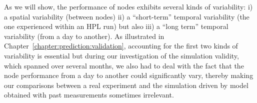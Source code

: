             As we will show, the performance of nodes exhibits several kinds of variability: i) a spatial variability
            (between nodes) ii) a ``short-term'' temporal variability (the one experienced within an HPL run) but also
            iii) a ``long term'' temporal variability (from a day to another). As illustrated in
            Chapter~\ref{chapter:prediction:validation}, accounting for the first two kinds of variability is essential
            but during our investigation of the simulation validity, which spanned over several months, we also had to
            deal with the fact that the node performance from a day to another could significantly vary, thereby making
            our comparisons between a real experiment and the simulation driven by model obtained with past measurements
            sometimes irrelevant.

